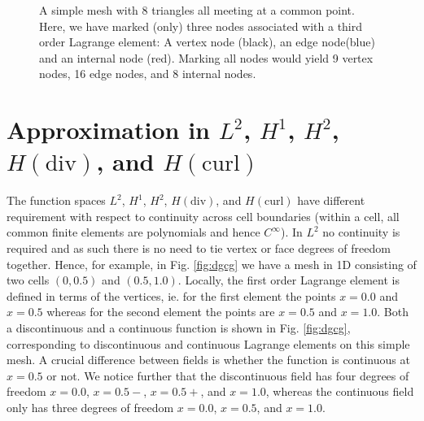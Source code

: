\begin{figure}
\begin{tikzpicture}[scale=3]
\end{tikzpicture}
\label{fig:Lagrange8elements}
\caption{A simple mesh with 8 triangles all meeting at a common point. 
Here, we have marked (only) three nodes associated with a third order Lagrange element: A vertex node (black), an edge node(blue) and an internal node (red).  
Marking all nodes would yield 9 vertex nodes,  16 edge nodes, and 8 internal nodes.  }
\end{figure}






\section{Approximation in  $L^2$, $H^1$, $H^2$, $H(\mbox{div})$, and $H(\mbox{curl})$ }

The function spaces 
$L^2$, $H^1$, $H^2$, $H(\mbox{div})$, and $H(\mbox{curl})$ 
have different requirement with respect to continuity across cell boundaries (within a cell, all common finite elements are 
polynomials and hence $C^\infty$). In $L^2$ no continuity is required and as such there is no need to tie vertex or face
degrees of freedom together. Hence, for example, in Fig. \ref{fig:dgcg} we have a mesh in 1D consisting of two cells $(0, 0.5)$ and
$(0.5, 1.0)$. Locally, the first order Lagrange element is defined in terms of the vertices, ie. for the first element the points
$x=0.0$ and $x=0.5$ whereas for the second element the points are $x=0.5$ and $x=1.0$. Both a discontinuous and a continuous
function is shown in Fig. \ref{fig:dgcg}, corresponding to discontinuous and continuous Lagrange elements on this simple mesh. 
A crucial difference between fields is whether the function is continuous at $x=0.5$ or not. 
We notice further that the discontinuous field has four degrees of freedom $x=0.0$, $x=0.5-$, $x=0.5+$, and $x=1.0$, whereas
the continuous field only has three degrees of freedom $x=0.0$, $x=0.5$, and $x=1.0$. 

